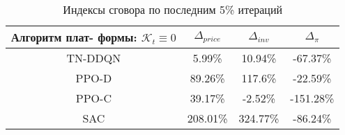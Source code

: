 \bgroup
\def\arraystretch{1.25}
\begin{table}[H]
	\caption{Индексы сговора по последним 5\% итераций}
	\label{tables:platforms_None}
	\begin{center}
		\vspace{-0.5em}
		\begin{tabular}{c||ccc}
			\toprule
			\makecell{Алгоритм плат-\\ формы: $\mathcal{K}_t \equiv 0$} & $\Delta_{price}$ & $\Delta_{inv}$ & $\Delta_{\pi}$ \\
			\midrule
			TN-DDQN & 5.99\% & 10.94\% & -67.37\% \\
			PPO-D & 89.26\% & 117.6\% & -22.59\% \\
			PPO-C & 39.17\% & -2.52\% & -151.28\% \\
			SAC & 208.01\% & 324.77\% & -86.24\% \\
			\bottomrule
		\end{tabular}
	\end{center}
\end{table}
\egroup